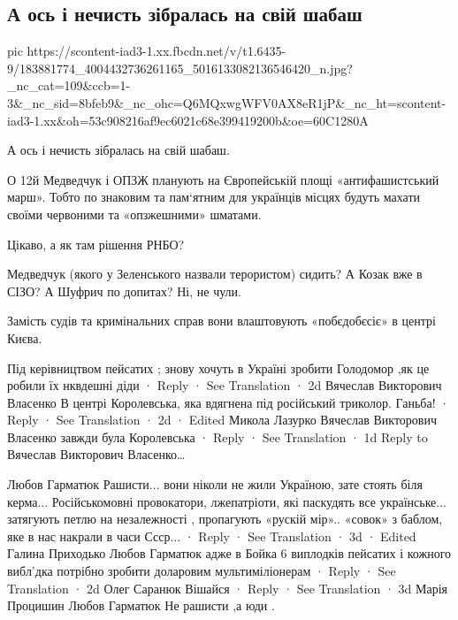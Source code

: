  
 
 
 
 

\subsection{А ось і нечисть зібралась на свій шабаш}


\ifcmt
  pic https://scontent-iad3-1.xx.fbcdn.net/v/t1.6435-9/183881774_4004432736261165_5016133082136546420_n.jpg?_nc_cat=109&ccb=1-3&_nc_sid=8bfeb9&_nc_ohc=Q6MQxwgWFV0AX8eR1jP&_nc_ht=scontent-iad3-1.xx&oh=53c908216af9ec6021c68e399419200b&oe=60C1280A
\fi


А ось і нечисть зібралась на свій шабаш. 

О 12й Медведчук і ОПЗЖ планують на Європейській площі «антифашистський марш».
Тобто по знаковим та пам‘ятним для українців місцях будуть махати своїми
червоними та «опзжешними» шматами.

Цікаво, а як там рішення РНБО? 

Медведчук (якого у Зеленського назвали терористом) сидить? А Козак вже в СІЗО?
А Шуфрич по допитах? Ні, не чули. 

Замість судів та кримінальних справ вони влаштовують «побєдобєсіє» в центрі Києва.

Під керівництвом пейсатих ; знову хочуть в Україні зробити Голодомор ,як це робили їх нквдешні діди
 · Reply · See Translation · 2d
Вячеслав Викторович Власенко
В центрі Королевська, яка вдягнена під російський триколор. Ганьба!
 · Reply · See Translation · 2d · Edited
Микола Лазурко
Вячеслав Викторович Власенко завжди була Королевська
 · Reply · See Translation · 1d
Reply to Вячеслав Викторович Власенко…

Любов Гарматюк
Рашисти... вони ніколи не жили Україною, зате стоять біля керма...
Російськомовні провокатори, лжепатріоти, які паскудять все українське... затягують петлю на незалежності , пропагують «рускій мір».. «совок» з баблом, яке в нас накрали в часи Ссср...
 · Reply · See Translation · 3d · Edited
Галина Приходько
Любов Гарматюк адже в Бойка 6 виплодків пейсатих і кожного вибл'дка потрібно зробити доларовим мультиміліонерам
 · Reply · See Translation · 2d
Олег Саранюк
Вішайся
 · Reply · See Translation · 3d
Марія Процишин
Любов Гарматюк Не рашисти ,а юди .

